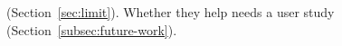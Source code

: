 (Section~\ref{sec:limit}). Whether they help needs a user study
(Section~\ref{subsec:future-work}).

